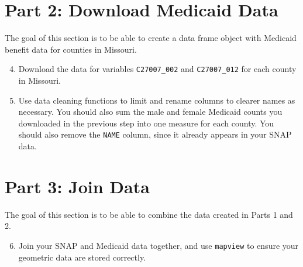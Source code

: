 \documentclass{tufte-handout}
\begin{document}
\vspace{5mm}
\section{Part 2: Download Medicaid Data}
The goal of this section is to be able to create a data frame object with Medicaid benefit data for counties in Missouri.
\begin{enumerate}
\setcounter{enumi}{3}
\item Download the data for variables \texttt{C27007\_002} and \texttt{C27007\_012} for each county in Missouri.
\item Use data cleaning functions to limit and rename columns to clearer names as necessary. You should also sum the male and female Medicaid counts you downloaded in the previous step into one measure for each county. You should also remove the \texttt{NAME} column, since it already appears in your SNAP data.
\end{enumerate}

\vspace{5mm}
\section{Part 3: Join Data}
The goal of this section is to be able to combine the data created in Parts 1 and 2.
\begin{enumerate}
\setcounter{enumi}{5}
\item Join your SNAP and Medicaid data together, and use \texttt{mapview} to ensure your geometric data are stored correctly.
\end{enumerate}

\end{document}
